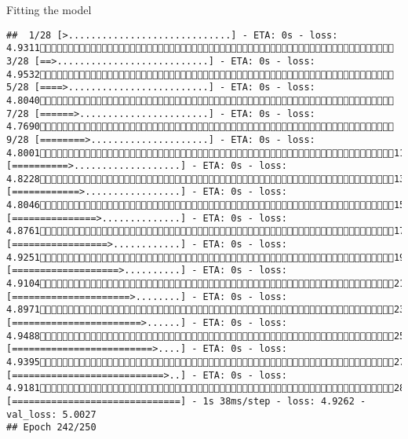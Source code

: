 \documentclass[
  ignorenonframetext,
]{beamer}
\begin{document}
\begin{frame}[fragile]{Fitting the model}
\begin{verbatim}
##  1/28 [>.............................] - ETA: 0s - loss: 4.9311 3/28 [==>...........................] - ETA: 0s - loss: 4.9532 5/28 [====>.........................] - ETA: 0s - loss: 4.8040 7/28 [======>.......................] - ETA: 0s - loss: 4.7690 9/28 [========>.....................] - ETA: 0s - loss: 4.800111/28 [==========>...................] - ETA: 0s - loss: 4.822813/28 [============>.................] - ETA: 0s - loss: 4.804615/28 [===============>..............] - ETA: 0s - loss: 4.876117/28 [=================>............] - ETA: 0s - loss: 4.925119/28 [===================>..........] - ETA: 0s - loss: 4.910421/28 [=====================>........] - ETA: 0s - loss: 4.897123/28 [=======================>......] - ETA: 0s - loss: 4.948825/28 [=========================>....] - ETA: 0s - loss: 4.939527/28 [===========================>..] - ETA: 0s - loss: 4.918128/28 [==============================] - 1s 38ms/step - loss: 4.9262 - val_loss: 5.0027
## Epoch 242/250

\end{verbatim}
\end{frame}
\end{document}
